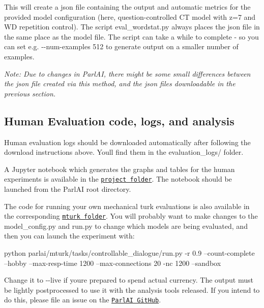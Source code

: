 This will create a json file containing the output and automatic metrics for the provided model configuration (here, question-\/controlled CT model with z=7 and WD repetition control). The script {\ttfamily eval\+\_\+wordstat.\+py} always places the json file in the same place as the model file. The script can take a while to complete -\/ so you can set e.\+g. {\ttfamily -\/-\/num-\/examples 512} to generate output on a smaller number of examples.

{\itshape Note\+: Due to changes in Parl\+AI, there might be some small differences between the json file created via this method, and the json files downloadable in the previous section.}

\subsection*{Human Evaluation code, logs, and analysis}

Human evaluation logs should be downloaded automatically after following the download instructions above. You\textquotesingle{}ll find them in the {\ttfamily evaluation\+\_\+logs/} folder.

A Jupyter notebook which generates the graphs and tables for the human experiments is available in the \href{https://github.com/facebookresearch/ParlAI/tree/master/projects/controllable_dialogue}{\tt project folder}. The notebook should be launched from the Parl\+AI root directory.

The code for running your own mechanical turk evaluations is also available in the corresponding \href{https://github.com/facebookresearch/ParlAI/tree/master/projects/controllable_dialogue/mturk}{\tt mturk folder}. You will probably want to make changes to the {\ttfamily model\+\_\+config.\+py} and {\ttfamily run.\+py} to change which models are being evaluated, and then you can launch the experiment with\+:


\begin{DoxyCode}
python parlai/mturk/tasks/controllable\_dialogue/run.py -r 0.9 --count-complete --hobby --max-resp-time 1200
       --max-connections 20 -nc 1200 --sandbox
\end{DoxyCode}
 Change it to {\ttfamily -\/-\/live} if you\textquotesingle{}re prepared to spend actual currency. The output must be lightly postprocessed to use it with the analysis tools released. If you intend to do this, please file an issue on the \href{https://github.com/facebookresearch/ParlAI/}{\tt Parl\+AI Git\+Hub}. 